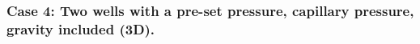 \documentclass[12pt]{article}
\begin{document}
% 

\subsubsection*{Case 4: Two wells with a pre-set pressure, capillary pressure, gravity included (3D).}
\end{document}
